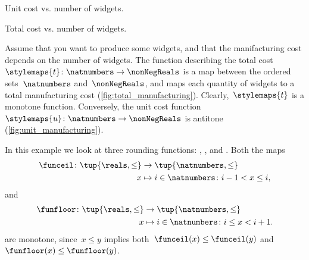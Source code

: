 


\begin{marginfigure}
    \caption{Unit cost vs. number of widgets.}
    \label{fig:unit_manufacturing}
\end{marginfigure}

\begin{marginfigure}
    \caption{Total cost vs. number of widgets.}
    \label{fig:total_manufacturing}
\end{marginfigure}

\begin{example}
    Assume that you want to produce some widgets, and that the manifacturing cost depends on the number of widgets.
    The function describing the total cost~$\stylemaps{t}\colon \natnumbers\to \nonNegReals$ is a map between the ordered sets~$\natnumbers$ and~$\nonNegReals$, and maps each quantity of widgets to a total manufacturing cost (\cref{fig:total_manufacturing}).
    Clearly,~$\stylemaps{t}$ is a monotone function.
    Conversely, the unit cost function~$\stylemaps{u}\colon \natnumbers\to \nonNegReals$ is antitone (\cref{fig:unit_manufacturing}).
\end{example}

\begin{example}
    \label{ex:rounding-functions}
    In this example we look at three rounding functions: \funceil, \funfloor, and \rtntte.
    Both the maps
    \begin{equation*}
        \begin{aligned}
            \funceil\colon \tup{\reals,\leq} & \to \tup{\natnumbers,\leq}                    \\
            x                                & \mapsto i \in \natnumbers \colon i-1<x\leq i,
        \end{aligned}
    \end{equation*}
    and
    \begin{equation*}
        \begin{aligned}
            \funfloor\colon \tup{\reals,\leq} & \to \tup{\natnumbers,\leq}                     \\
            x                                 & \mapsto i \in \natnumbers \colon i\leq x< i+1.
        \end{aligned}
    \end{equation*}
    are monotone, since~$x\leq y$ implies both~$\funceil(x)\leq \funceil(y)$ and~$\funfloor(x)\leq\funfloor(y)$.
\end{example}

